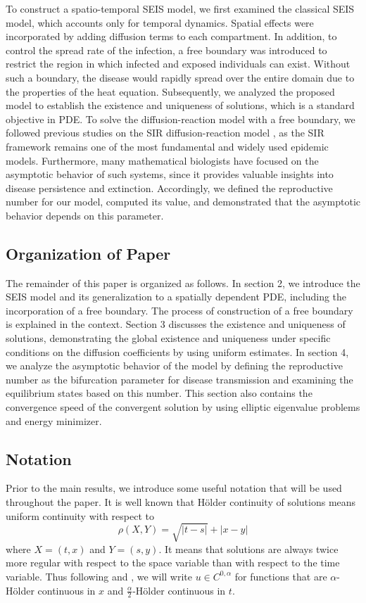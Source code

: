 \documentclass[11pt]{amsart}
\numberwithin{equation}{section}
\theoremstyle{plain}
\theoremstyle{definition}
\begin{document}
To construct a spatio-temporal SEIS model, we first examined the classical SEIS model, which accounts only for temporal dynamics. Spatial effects were incorporated by adding diffusion terms to each compartment. In addition, to control the spread rate of the infection, a free boundary was introduced to restrict the region in which infected and exposed individuals can exist. Without such a boundary, the disease would rapidly spread over the entire domain due to the properties of the heat equation. Subsequently, we analyzed the proposed model to establish the existence and uniqueness of solutions, which is a standard objective in PDE. To solve the diffusion-reaction model with a free boundary, we followed previous studies on the SIR diffusion-reaction model \cite{Kim_2013}, as the SIR framework remains one of the most fundamental and widely used epidemic models. Furthermore, many mathematical biologists have focused on the asymptotic behavior of such systems, since it provides valuable insights into disease persistence and extinction. Accordingly, we defined the reproductive number for our model, computed its value, and demonstrated that the asymptotic behavior depends on this parameter. 
	
\subsection{Organization of Paper}
The remainder of this paper is organized as follows. In section 2, we introduce the SEIS model and its generalization to a spatially dependent PDE, including the incorporation of a free boundary. The process of construction of a free boundary is explained in the context. Section 3 discusses the existence and uniqueness of solutions, demonstrating the global existence and uniqueness under specific conditions on the diffusion coefficients by using uniform estimates. In section 4, we analyze the asymptotic behavior of the model by defining the reproductive number as the bifurcation parameter for disease transmission and examining the equilibrium states based on this number. This section also contains the convergence speed of the convergent solution by using elliptic eigenvalue problems and energy minimizer.
	
\subsection{Notation}
Prior to the main results, we introduce some useful notation that will be used throughout the paper. It is well known that H\"older continuity of solutions means uniform continuity with respect to
\begin{equation*}
	\rho(X,Y)=\sqrt{\lvert t-s \rvert}+\lvert x-y \lvert
\end{equation*}
where $X=(t,x)$ and $Y=(s,y)$. It means that solutions are always twice more regular with respect to the space variable than with respect to the time variable.
Thus following \cite{Krylov_1996} and \cite{Boucksom_2013}, we will write $u\in C^{0,\alpha}$ for functions that are $\alpha$-H\"older continuous in $x$ and $\frac{\alpha}{2}$-H\"older continuous in $t$.
\end{document}
